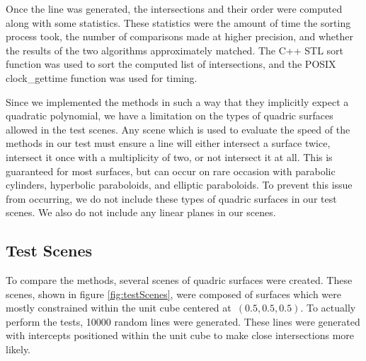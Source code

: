 \documentclass{cccg16}
\begin{document}
Once the line was generated, the intersections and their order were
computed along with some statistics.  These statistics were the amount
of time the sorting process took, the number of comparisons made at
higher precision, and whether the results of the two algorithms
approximately matched.  The C++ STL sort function was used to sort the
computed list of intersections, and the POSIX clock\_gettime function
was used for timing.

Since we implemented the methods in such a way that they implicitly
expect a quadratic polynomial, we have a limitation on the types of
quadric surfaces allowed in the test scenes.  Any scene which is used
to evaluate the speed of the methods in our test must ensure a line
will either intersect a surface twice, intersect it once with a
multiplicity of two, or not intersect it at all.  This is guaranteed
for most surfaces, but can occur on rare occasion with parabolic
cylinders, hyperbolic paraboloids, and elliptic paraboloids.  To
prevent this issue from occurring, we do not include these types of
quadric surfaces in our test scenes.  We also do not include any
linear planes in our scenes.

\subsection{Test Scenes}
To compare the methods, several scenes of quadric surfaces were
created.  These scenes, shown in figure \ref{fig:testScenes}, were
composed of surfaces which were mostly constrained within the unit
cube centered at~$(0.5, 0.5, 0.5)$.  To actually perform the tests,
10000 random lines were generated.  These lines were generated with
intercepts positioned within the unit cube to make close intersections
more likely.
\end{document}
